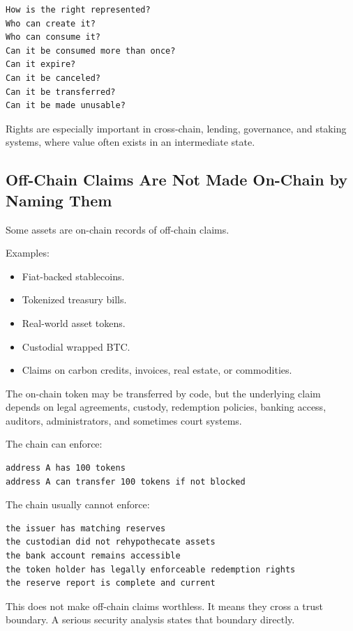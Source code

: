 \begin{lstlisting}
How is the right represented?
Who can create it?
Who can consume it?
Can it be consumed more than once?
Can it expire?
Can it be canceled?
Can it be transferred?
Can it be made unusable?
\end{lstlisting}

Rights are especially important in cross-chain, lending, governance, and
staking systems, where value often exists in an intermediate state.

\subsection{Off-Chain Claims Are Not Made On-Chain by Naming Them}

Some assets are on-chain records of off-chain claims.

Examples:

\begin{itemize}
\tightlist
\item
  Fiat-backed stablecoins.
\item
  Tokenized treasury bills.
\item
  Real-world asset tokens.
\item
  Custodial wrapped BTC.
\item
  Claims on carbon credits, invoices, real estate, or commodities.
\end{itemize}

The on-chain token may be transferred by code, but the underlying claim
depends on legal agreements, custody, redemption policies, banking
access, auditors, administrators, and sometimes court systems.

The chain can enforce:

\begin{lstlisting}
address A has 100 tokens
address A can transfer 100 tokens if not blocked
\end{lstlisting}

The chain usually cannot enforce:

\begin{lstlisting}
the issuer has matching reserves
the custodian did not rehypothecate assets
the bank account remains accessible
the token holder has legally enforceable redemption rights
the reserve report is complete and current
\end{lstlisting}

This does not make off-chain claims worthless. It means they cross a
trust boundary. A serious security analysis states that boundary
directly.

